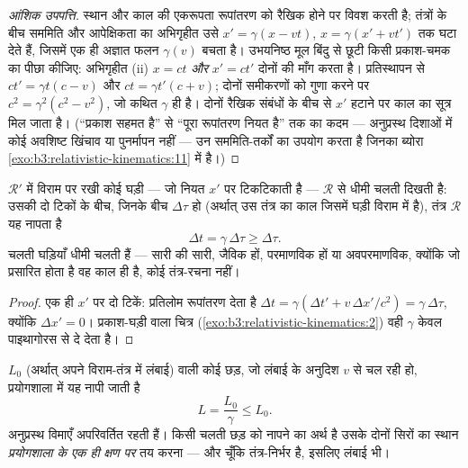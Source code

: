 \begin{proof}[आंशिक उपपत्ति]
स्थान और काल की एकरूपता रूपांतरण को रैखिक होने पर विवश करती है;
तंत्रों के बीच सममिति और आपेक्षिकता का अभिगृहीत उसे
$x' = \gamma(x - vt)$, $x = \gamma(x' + vt')$ तक घटा देते हैं, जिसमें
एक ही अज्ञात फलन $\gamma(v)$ बचता है। उभयनिष्ठ मूल बिंदु से छूटी किसी
प्रकाश-चमक का पीछा कीजिए: अभिगृहीत (ii) $x = ct$ \emph{और} $x' = ct'$
दोनों की माँग करता है।
प्रतिस्थापन से $ct' = \gamma t(c - v)$ और $ct = \gamma t'(c + v)$;
दोनों समीकरणों को गुणा करने पर $c^2 = \gamma^2(c^2 - v^2)$, जो कथित
$\gamma$ ही है। दोनों रैखिक संबंधों के बीच से $x'$ हटाने पर
काल का सूत्र मिल जाता है। (``प्रकाश सहमत है'' से ``पूरा
रूपांतरण नियत है'' तक का कदम --- अनुप्रस्थ दिशाओं में कोई अवशिष्ट
खिंचाव या पुनर्मापन नहीं --- उन सममिति-तर्कों का उपयोग करता है जिनका
ब्योरा \cref{exo:b3:relativistic-kinematics:11} में है।)
\end{proof}

\begin{proposition}[काल-प्रसार]\label{prop:b3:relativistic-kinematics:dilation}
$\mathcal R'$ में विराम पर रखी कोई घड़ी --- जो नियत $x'$ पर टिकटिकाती है
--- $\mathcal R$ से धीमी चलती दिखती है: उसकी दो टिकों के बीच, जिनके बीच
\emph{} $\Delta\tau$ हो (अर्थात् उस तंत्र का काल जिसमें
घड़ी विराम में है), तंत्र $\mathcal R$ यह नापता है
\[
\Delta t = \gamma\,\Delta\tau \ge \Delta\tau .
\]
चलती घड़ियाँ धीमी चलती हैं --- सारी की सारी, जैविक हों, परमाणविक हों या
अवपरमाणविक, क्योंकि जो प्रसारित होता है वह काल ही है, कोई तंत्र-रचना नहीं।
\end{proposition}

\begin{proof}
एक ही $x'$ पर दो टिकें: प्रतिलोम रूपांतरण देता है $\Delta t
= \gamma(\Delta t' + v\,\Delta x'/c^2) = \gamma\,\Delta\tau$, क्योंकि
$\Delta x' = 0$। प्रकाश-घड़ी वाला चित्र
(\cref{exo:b3:relativistic-kinematics:2}) वही $\gamma$ केवल
पाइथागोरस से दे देता है।
\end{proof}

\begin{proposition}[लंबाई-संकुचन]\label{prop:b3:relativistic-kinematics:contraction}
\emph{} $L_0$ (अर्थात् अपने विराम-तंत्र में लंबाई) वाली कोई
छड़, जो लंबाई के अनुदिश $v$ से चल रही हो, प्रयोगशाला में यह नापी जाती है
\[
L = \frac{L_0}{\gamma} \le L_0 .
\]
अनुप्रस्थ विमाएँ अपरिवर्तित रहती हैं। किसी चलती छड़ को नापने का अर्थ है
उसके दोनों सिरों का स्थान \emph{प्रयोगशाला के एक ही क्षण पर} तय करना
--- और चूँकि  तंत्र-निर्भर है, इसलिए लंबाई भी।
\end{proposition}

